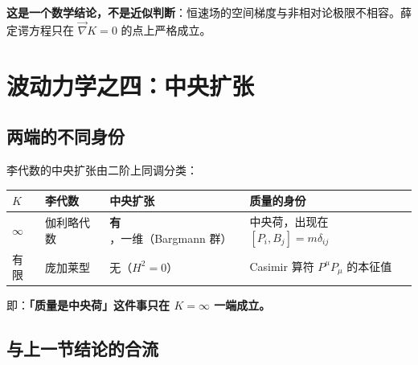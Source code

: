 \documentclass[
  chinese,
  a4paper,
  UTF8,
  12pt,
  oneside,
  openany]{ctexbook}
\newcounter{none} %
\theoremstyle{plain}
\theoremstyle{plain}
\theoremstyle{plain}
\theoremstyle{definition}
\theoremstyle{plain}
\theoremstyle{plain}
\theoremstyle{remark}
\begin{document}
\textbf{这是一个数学结论，不是近似判断}：恒速场的空间梯度与非相对论极限不相容。薛定谔方程只在
\(\vec\nabla K=0\) 的点上严格成立。

\section{波动力学之四：中央扩张}\label{sec-isd-bargmann}

\subsection{两端的不同身份}\label{ux4e24ux7aefux7684ux4e0dux540cux8eabux4efd}

李代数的中央扩张由二阶上同调分类：

{\def\LTcaptype{none} %
\begin{longtable}[]{@{}
  >{\raggedright\arraybackslash}p{}
  >{\raggedright\arraybackslash}p{}
  >{\raggedright\arraybackslash}p{}
  >{\raggedright\arraybackslash}p{}@{}}
\toprule\noalign{}
\begin{minipage}[b]{\linewidth}\raggedright
\(K\)
\end{minipage} & \begin{minipage}[b]{\linewidth}\raggedright
李代数
\end{minipage} & \begin{minipage}[b]{\linewidth}\raggedright
中央扩张
\end{minipage} & \begin{minipage}[b]{\linewidth}\raggedright
质量的身份
\end{minipage} \\
\midrule\noalign{}
\endhead
\bottomrule\noalign{}
\endlastfoot
\(\infty\) & 伽利略代数 & \textbf{有}，一维（Bargmann 群） &
中央荷，出现在 \([P_i,B_j]=m\delta_{ij}\) \\
有限 & 庞加莱型 & 无（\(H^{2}=0\)） & Casimir 算符 \(P^{\mu}P_{\mu}\)
的本征值 \\
\end{longtable}
}

即：\textbf{「质量是中央荷」这件事只在 \(K=\infty\) 一端成立。}

\subsection{与上一节结论的合流}\label{ux4e0eux4e0aux4e00ux8282ux7ed3ux8bbaux7684ux5408ux6d41}
\end{document}
